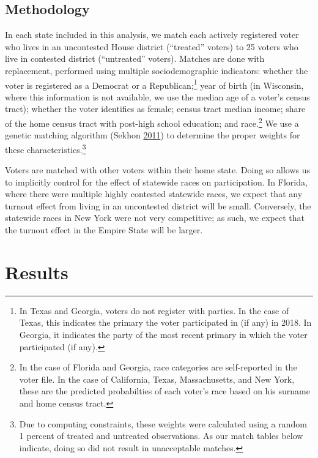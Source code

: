 \documentclass[
  12pt,
]{article}
\begin{document}
\hypertarget{methodology}{%
\subsection*{Methodology}\label{methodology}}

In each state included in this analysis, we match each actively registered voter who lives in an uncontested House district (``treated'' voters) to 25 voters who live in contested district (``untreated'' voters). Matches are done with replacement, performed using multiple sociodemographic indicators: whether the voter is registered as a Democrat or a Republican;\footnote{In Texas and Georgia, voters do not register with parties. In the case of Texas, this indicates the primary the voter participated in (if any) in 2018. In Georgia, it indicates the party of the most recent primary in which the voter participated (if any).} year of birth (in Wisconsin, where this information is not available, we use the median age of a voter's census tract); whether the voter identifies as female; census tract median income; share of the home census tract with post-high school education; and race.\footnote{In the case of Florida and Georgia, race categories are self-reported in the voter file. In the case of California, Texas, Massachusetts, and New York, these are the predicted probabilties of each voter's race based on his surname and home census tract.} We use a genetic matching algorithm (Sekhon \protect\hyperlink{ref-Sekhon2011}{2011}) to determine the proper weights for these characteristics.\footnote{Due to computing constraints, these weights were calculated using a random 1 percent of treated and untreated observations. As our match tables below indicate, doing so did not result in unacceptable matches.}

Voters are matched with other voters within their home state. Doing so allows us to implicitly control for the effect of statewide races on participation. In Florida, where there were multiple highly contested statewide races, we expect that any turnout effect from living in an uncontested district will be small. Conversely, the statewide races in New York were not very competitive; as such, we expect that the turnout effect in the Empire State will be larger.

\hypertarget{results}{%
\section*{Results}\label{results}}
\end{document}
